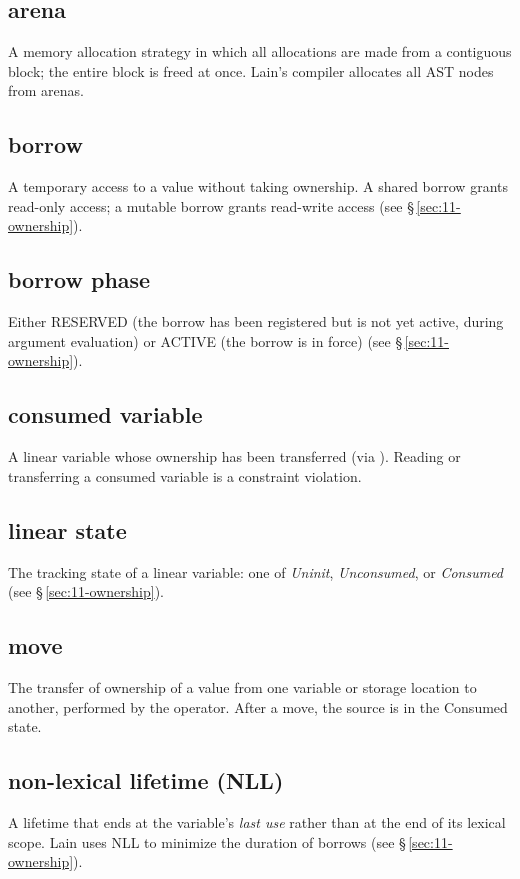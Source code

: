 \subsection*{arena}
A memory allocation strategy in which all allocations are made from a
contiguous block; the entire block is freed at once.  Lain's compiler
allocates all AST nodes from arenas.

\subsection*{borrow}
A temporary access to a value without taking ownership.  A shared borrow
grants read-only access; a mutable borrow grants read-write access
(see \S\,\ref{sec:11-ownership}).

\subsection*{borrow phase}
Either RESERVED (the borrow has been registered but is not yet active,
during argument evaluation) or ACTIVE (the borrow is in force)
(see \S\,\ref{sec:11-ownership}).

\subsection*{consumed variable}
A linear variable whose ownership has been transferred (via ).
Reading or transferring a consumed variable is a constraint violation.

\subsection*{linear state}
The tracking state of a linear variable: one of \textit{Uninit},
\textit{Unconsumed}, or \textit{Consumed} (see \S\,\ref{sec:11-ownership}).

\subsection*{move}
The transfer of ownership of a value from one variable or storage location
to another, performed by the  operator.  After a move, the
source is in the Consumed state.

\subsection*{non-lexical lifetime (NLL)}
A lifetime that ends at the variable's \textit{last use} rather than at the
end of its lexical scope.  Lain uses NLL to minimize the duration of borrows
(see \S\,\ref{sec:11-ownership}).


